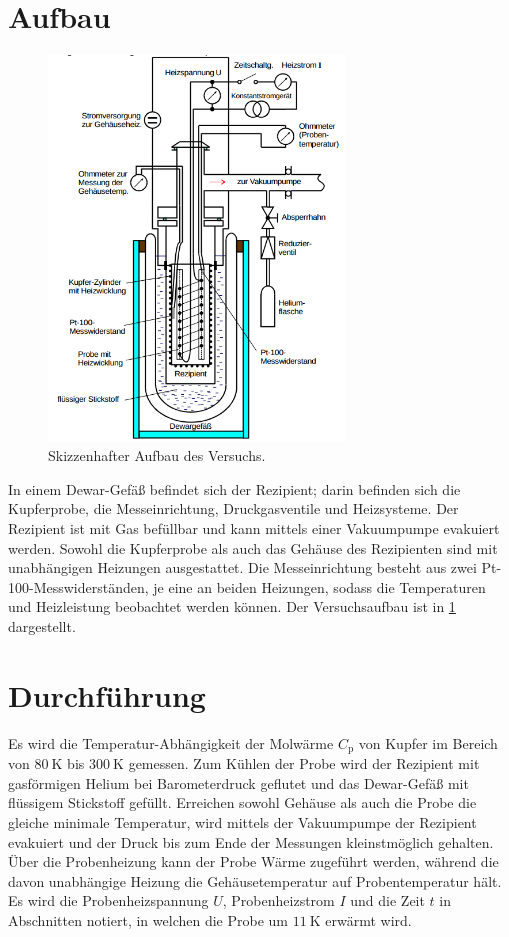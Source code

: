 \section{Aufbau}
\begin{figure}
	\includegraphics[width=0.7\textwidth,]{graphics/aufbau.png}
	\caption{Skizzenhafter Aufbau des Versuchs. \cite{skript}}
	\label{fig:aufbau}
\end{figure}
In einem Dewar-Gefäß befindet sich der Rezipient; 
darin befinden sich die Kupferprobe, die Messeinrichtung, Druckgasventile und Heizsysteme.
Der Rezipient ist mit Gas befüllbar und kann mittels einer Vakuumpumpe evakuiert werden. 
Sowohl die Kupferprobe als auch das Gehäuse des Rezipienten sind mit unabhängigen Heizungen ausgestattet.
Die Messeinrichtung besteht aus zwei Pt-100-Messwiderständen, 
je eine an beiden Heizungen, 
sodass die Temperaturen und Heizleistung beobachtet werden können.
Der Versuchsaufbau ist in \ref{fig:aufbau} dargestellt.


\section{Durchführung}
Es wird die Temperatur-Abhängigkeit der Molwärme $C_\text{p}$ von Kupfer im
Bereich von $\SI{80}{\kelvin}$ bis $\SI{300}{\kelvin}$ gemessen. 
Zum Kühlen der Probe wird der Rezipient mit gasförmigen Helium bei Barometerdruck geflutet 
und das Dewar-Gefäß mit flüssigem Stickstoff gefüllt.
Erreichen sowohl Gehäuse als auch die Probe die gleiche minimale Temperatur, 
wird mittels der Vakuumpumpe der Rezipient evakuiert und der Druck bis zum Ende der Messungen kleinstmöglich gehalten.
Über die Probenheizung kann der Probe Wärme zugeführt werden, 
während die davon unabhängige Heizung die Gehäusetemperatur auf Probentemperatur hält.
Es wird die Probenheizspannung $U$, Probenheizstrom $I$ und die Zeit $t$ in Abschnitten notiert, 
in welchen die Probe um $\SI{11}{\kelvin}$ erwärmt wird.